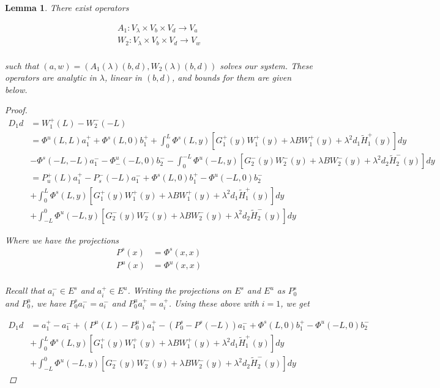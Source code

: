 \documentclass[12pt]{article}
\newtheorem{lemma}{Lemma}
\begin{document}
\begin{lemma}
There exist operators

\begin{align*}
A_1: V_\lambda \times V_b \times V_d \rightarrow V_a \\
W_2: V_\lambda \times V_b \times V_d \rightarrow V_w \\
\end{align*}

such that $(a,w) = ( A_1(\lambda)(b,d), W_2(\lambda)(b,d) )$ solves our system. These operators are analytic in $\lambda$, linear in $(b,d)$, and bounds for them are given below.

\begin{proof}
\begin{align*}
D_1 d &= W_1^+(L) - W_2^-(-L) \\
&= \Phi^u(L, L)a^+_{1} + \Phi^s(L, 0)b_1^+ 
+ \int_0^L \Phi^s(L, y)[G_1^+(y) W_1^+(y) + \lambda B W_1^+(y) + \lambda^2 d_1 \tilde{H}_1^+(y) ] dy \\  
&- \Phi^s(-L, -L)a^-_{1} - \Phi^u_-(-L, 0)b_2^- - \int_0^{-L} \Phi^u(-L, y)[G_2^-(y) W_2^-(y) + \lambda B W_2^-(y) + \lambda^2 d_2 \tilde{H}_2^-(y) ] dy \\
&= P_u^+(L) a^+_{1} - P_s^-(-L) a^-_{1} + \Phi^s(L, 0)b_1^+ - \Phi^u(-L, 0)b_2^- \\
&+ \int_0^L \Phi^s(L, y)[G_1^+(y) W_1^+(y) + \lambda B W_1^+(y) + \lambda^2 d_1 \tilde{H}_1^+(y) ] dy \\
&+ \int_{-L}^0 \Phi^u(-L, y)[G_2^-(y) W_2^-(y) + \lambda B W_2^-(y) + \lambda^2 d_2 \tilde{H}_2^-(y) ] dy 
\end{align*}

Where we have the projections
\begin{align*}
P^s(x) &= \Phi^s(x,x) \\
P^u(x) &= \Phi^u(x,x) \\
\end{align*}

Recall that $a_i^- \in E^s$ and $a_i^+ \in E^u$. Writing the projections on $E^s$ and $E^u$ as $P_0^s$ and $P_0^u$, we have $P_0^s a_i^- = a_i^-$ and $P_0^u a_i^+ = a_i^+$. Using these above with $i = 1$, we get 

\begin{align*}
D_1 d &=  a^+_1 - a^-_1 + (P^u(L) - P_0^u) a^+_1 - (P_0^s - P^s(-L)) a^-_1 + \Phi^s(L, 0)b_1^+ - \Phi^u(-L, 0)b_2^- \\
&+ \int_0^L \Phi^s(L, y)[G_1^+(y) W_1^+(y) + \lambda B W_1^+(y) + \lambda^2 d_1 \tilde{H}_1^+(y) ] dy \\
&+ \int_{-L}^0 \Phi^u(-L, y)[G_2^-(y) W_2^-(y) + \lambda B W_2^-(y) + \lambda^2 d_2 \tilde{H}_2^-(y) ] dy 
\end{align*}


\end{proof}
\end{lemma}
\end{document}
